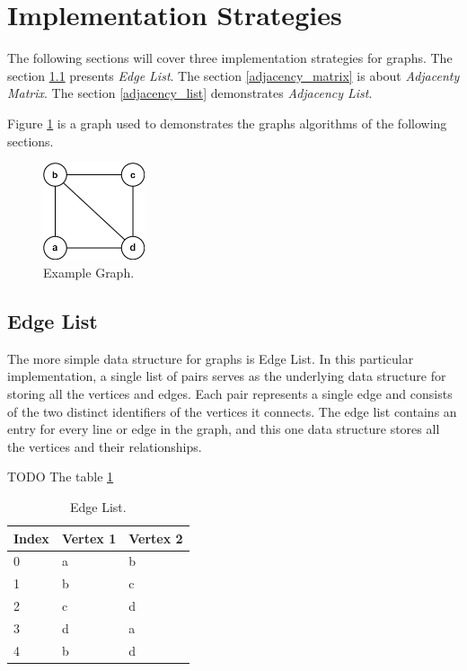 \documentclass[a4paper]{article}
\begin{document}
    \section{Implementation Strategies}    
    

    The following sections will cover three implementation strategies for graphs.
    The section \ref{edgelist} presents \emph{Edge List}.
    The section \ref{adjacency_matrix} is about \emph{Adjacenty Matrix}.
    The section \ref{adjacency_list} demonstrates \emph{Adjacency List}.

    Figure \ref{graph-algorithm-example} is a graph used to demonstrates
    the graphs algorithms of the following sections.

    \begin{figure}[H]
        \centering
        \includegraphics[width=30mm]{images/graphs-undirected.png}
        \vspace*{3mm}
        \caption{Example Graph.}
        \label{graph-algorithm-example}
    \end{figure}

    
    \subsection{Edge List} \label{edgelist}

    The more simple data structure for graphs is Edge List.
    In this particular implementation, a single list of pairs serves as the 
    underlying data structure for storing all the vertices and edges. Each pair 
    represents a single edge and consists of the two distinct identifiers of the 
    vertices it connects. The edge list contains an entry for every line or edge 
    in the graph, and this one data structure stores all the vertices and their 
    relationships. 
    
     TODO The table \ref{tab:edge-list} 

    \begin{table}[H]
        \centering
        \caption{\label{tab:edge-list}Edge List.}
        \vspace*{10pt}
        \begin{tabular}{ |l|l|l| } 
            \hline
            Index & Vertex 1 & Vertex 2 \\
            \hline
            0   & a & b \\
            \hline
            1   & b & c \\
            \hline
            2   & c & d \\
            \hline
            3   & d & a \\
            \hline
            4   & b & d \\
            \hline            
        \end{tabular}
    \end{table}
\end{document}

